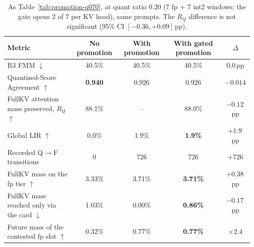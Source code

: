 \begin{table}[t]
\centering
\small
\setlength{\tabcolsep}{3.5pt}
\begin{tabular}{@{}lcccc@{}}
\toprule
Metric & No promotion & With promotion & With gated promotion & $\Delta$ \\
\midrule
R3 FMM $\downarrow$                                  & 40.5\%         & 40.5\% & 40.5\%          & $0.0$\,pp    \\
Quantized-Score Agreement $\uparrow$                 & \textbf{0.940} & 0.926  & 0.926           & $-0.014$     \\
FullKV attention mass preserved, $R_Q$ $\uparrow$    & 88.1\%         & --     & 88.0\%          & $-0.12$\,pp  \\
Global LIR $\uparrow$                                & 0.0\%          & 1.9\%  & \textbf{1.9\%}  & $+1.9$\,pp   \\
Recorded Q$\to$F transitions                         & 0              & 726    & 726             & $+726$       \\
\midrule
FullKV mass on the fp tier $\uparrow$                & 3.33\%         & 3.71\% & \textbf{3.71\%} & $+0.38$\,pp  \\
FullKV mass reached only via the card $\downarrow$   & 1.03\%         & 0.00\% & \textbf{0.86\%} & $-0.17$\,pp  \\
Future mass of the contested fp slot $\uparrow$      & 0.32\%         & 0.77\% & \textbf{0.77\%} & $\times 2.4$ \\
\bottomrule
\end{tabular}
\caption{As Table~\ref{tab:promotion-q070}, at quant ratio 0.20 (7 fp + 7 int2
windows; the gate opens 2 of 7 per KV head), same prompts. The $R_Q$ difference is
not significant (95\% CI $[-0.36, +0.09]$\,pp).}
\label{tab:promotion-q020}
\end{table}
